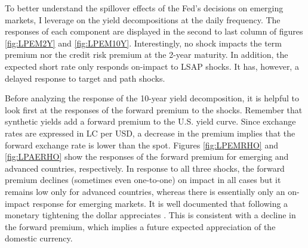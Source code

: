 {To better understand the spillover effects of the Fed's decisions on emerging markets, I leverage on the yield decompositions at the daily frequency.
The responses of each component are displayed in the second to last column of figures \ref{fig:LPEM2Y} and \ref{fig:LPEM10Y}.
Interestingly, no shock impacts the term premium nor the credit risk premium at the 2-year maturity.
In addition, the expected short rate only responds on-impact to LSAP shocks.
It has, however, a delayed response to target and path shocks.

Before analyzing the response of the 10-year yield decomposition, it is helpful to look first at the responses of the forward premium to the shocks.
Remember that synthetic yields add a forward premium to the U.S. yield curve.
Since exchange rates are expressed in LC per USD, a decrease in the premium implies that the forward exchange rate is lower than the spot.
Figures \ref{fig:LPEMRHO} and \ref{fig:LPAERHO} show the responses of the forward premium for emerging and advanced countries, respectively.
In response to all three shocks, the forward premium declines (sometimes even one-to-one) on impact in all cases but it remains low only for advanced countries, whereas there is essentially only an on-impact response for emerging markets.
It is well documented that following a monetary tightening the dollar appreciates
\citep{FerrariKearnsSchrimpf:2017}.
This is consistent with a decline in the forward premium, which implies a future expected appreciation of the domestic currency.

}
